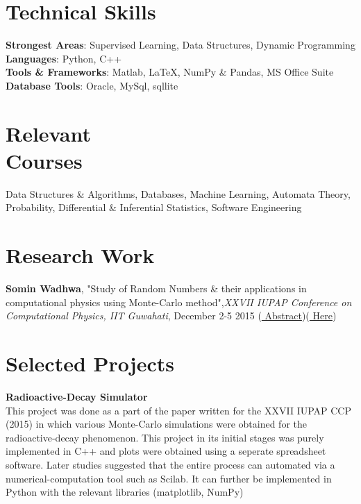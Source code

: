 \documentclass[margin,line]{res}
\begin{document}
\begin{resume}
\section{\sc Technical Skills}
{\bf Strongest Areas}: Supervised Learning, Data Structures, Dynamic Programming\\
{\bf Languages}: Python, C++\\
{\bf Tools \& Frameworks}: Matlab, \LaTeX, NumPy \& Pandas, MS Office Suite  \\
{\bf Database Tools}: Oracle, MySql, sqllite 

\section{\sc Relevant \\Courses}
Data Structures \& Algorithms, Databases, Machine Learning, Automata Theory, Probability, 
Differential \& Inferential Statistics, Software Engineering 

\section{\sc Research Work}

{\bf Somin Wadhwa}, "Study of Random Numbers \& their applications in computational physics using Monte-Carlo method",{\em  XXVII IUPAP Conference on Computational Physics, IIT Guwahati}, December 2-5 2015 ({\href{https://drive.google.com/open?id=0B8hsJozmBILETlV3VVQ3S21NLTg}{\color{blue} Abstract}})({\href{https://drive.google.com/open?id=0B8hsJozmBILEcGRiT2VzZ0hFUEE}{\color{blue} Here}})

\section{\sc Selected Projects}
{\bf Radioactive-Decay Simulator}\\
This project was done as a part of the paper written for the XXVII IUPAP CCP (2015) in which various Monte-Carlo 
simulations were obtained for the radioactive-decay phenomenon. This project in its initial stages was purely
implemented in C++ and plots were obtained using a seperate spreadsheet software. Later studies suggested that the entire 
process can automated via a numerical-computation tool such as Scilab. It can further be implemented in Python with
the relevant libraries (matplotlib, NumPy)\\


\end{resume}
\end{document}
